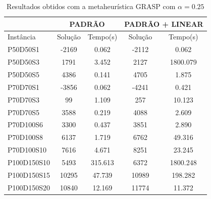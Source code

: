 \documentclass{MO824}
\begin{document}
\begin{table}[ht]
\centering
\caption{Resultados obtidos com a metaheurística GRASP com $\alpha=0.25$}
\label{tab-grasp-1}
\begin{tabular}{|l|c|c|c|c|}
\hline
            & \multicolumn{2}{c|}{PADRÃO} & \multicolumn{2}{c|}{PADRÃO + LINEAR} \\ \hline
Instância   & Solução      & Tempo(s)     & Solução          & Tempo(s)          \\ \hline
P50D50S1    & -2169        & 0.062        & -2112            & 0.062             \\ \hline
P50D50S3    & 1791         & 3.452        & 2127             & 1800.079          \\ \hline
P50D50S5    & 4386         & 0.141        & 4705             & 1.875             \\ \hline
P70D70S1    & -3856        & 0.062        & -4241            & 0.421             \\ \hline
P70D70S3    & 99           & 1.109        & 257              & 10.123            \\ \hline
P70D70S5    & 3588         & 0.219        & 4088             & 2.609             \\ \hline
P70D100S6   & 3300         & 0.437        & 3851             & 2.890             \\ \hline
P70D100S8   & 6137         & 1.719        & 6762             & 49.316            \\ \hline
P70D100S10  & 7616         & 4.671        & 8251             & 23.245            \\ \hline
P100D150S10 & 5493         & 315.613      & 6372             & 1800.248          \\ \hline
P100D150S15 & 10295        & 47.739       & 10989            & 198.282           \\ \hline
P100D150S20 & 10840        & 12.169       & 11774            & 11.372            \\ \hline
\end{tabular}%
\end{table}
\end{document}

